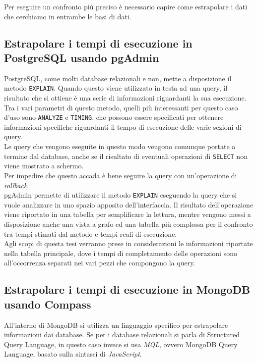 Per eseguire un confronto più preciso è necessario capire come estrapolare i dati che cerchiamo in entrambe le basi di dati.

\subsection{Estrapolare i tempi di esecuzione in PostgreSQL usando pgAdmin}
PostgreSQL, come molti database relazionali e non, mette a disposizione il metodo \texttt{EXPLAIN}. Quando questo viene utilizzato in testa ad una query, il risultato che si ottiene è una serie di informazioni riguardanti la sua esecuzione. Tra i vari parametri di questo metodo, quelli più interessanti per questo caso d'uso sono \texttt{ANALYZE} e \texttt{TIMING}, che possono essere specificati per ottenere informazioni specifiche riguardanti il tempo di esecuzione delle varie sezioni di query.\\
Le query che vengono eseguite in questo modo vengono comunque portate a termine dal database, anche se il risultato di eventuali operazioni di \texttt{SELECT} non viene mostrato a schermo.\\
Per impedire che questo accada è bene seguire la query con un'operazione di \textit{rollback}.\\

\noindent pgAdmin permette di utilizzare il metodo \texttt{EXPLAIN} eseguendo la query che si vuole analizzare in uno spazio apposito dell'interfaccia. Il risultato dell'operazione viene riportato in una tabella per semplificare la lettura, mentre vengono messi a disposizione anche una vista a grafo ed una tabella più complessa per il confronto tra tempi stimati dal metodo e tempi reali di esecuzione.\\
Agli scopi di questa tesi verranno prese in considerazioni le informazioni riportate nella tabella principale, dove i tempi di completamento delle operazioni sono all'occorrenza separati nei vari pezzi che compongono la query.

\subsection{Estrapolare i tempi di esecuzione in MongoDB usando Compass}
All'interno di MongoDB si utilizza un linguaggio specifico per estrapolare informazioni dai database. Se per i database relazionali si parla di Structured Query Language, in questo caso invece si usa \textit{MQL}, ovvero MongoDB Query Language, basato sulla sintassi di \textit{JavaScript}.\\

